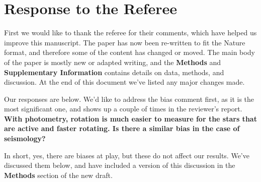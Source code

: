 \documentclass[11pt]{article}
\begin{document}
	
\section*{Response to the Referee}

First we would like to thank the referee for their comments, which have helped us improve this manuscript. The paper has now been re-written to fit the Nature format, and therefore some of the content has changed or moved. The main body of the paper is mostly new or adapted writing, and the \textbf{Methods} and \textbf{Supplementary Information} contains details on data, methods, and discussion. At the end of this document we’ve listed any major changes made.

Our responses are below. We’d like to address the bias comment first, as it is the most significant one, and shows up a couple of times in the reviewer’s report. \\

\noindent \textbf{With photometry, rotation is much easier to measure for the stars that are active and faster rotating. Is there a similar bias in the case of seismology? }

In short, yes, there are biases at play, but these do not affect our results. We’ve discussed them below, and have included a version of this discussion in the \textbf{Methods} section of the new draft.
\end{document}
